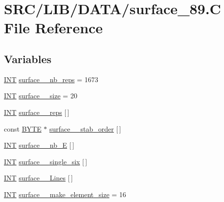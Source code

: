 \hypertarget{surface__89_8_c}{}\section{S\+R\+C/\+L\+I\+B/\+D\+A\+T\+A/surface\+\_\+89.C File Reference}
\label{surface__89_8_c}
\subsection*{Variables}
\begin{DoxyCompactItemize}
\item 
\mbox{\hyperlink{galois_8h_a09fddde158a3a20bd2dcadb609de11dc}{I\+NT}} \mbox{\hyperlink{surface__89_8_c_a9b66df6cbbe464f25589d29b6415114b}{surface\+\_\+\_\+nb\+\_\+reps}} = 1673
\item 
\mbox{\hyperlink{galois_8h_a09fddde158a3a20bd2dcadb609de11dc}{I\+NT}} \mbox{\hyperlink{surface__89_8_c_ab1dce224114a93e0c65da89bc68ef58b}{surface\+\_\+\_\+size}} = 20
\item 
\mbox{\hyperlink{galois_8h_a09fddde158a3a20bd2dcadb609de11dc}{I\+NT}} \mbox{\hyperlink{surface__89_8_c_ab1680931c7ff868b82d0608fe9622550}{surface\+\_\+\_\+reps}} \mbox{[}$\,$\mbox{]}
\item 
const \mbox{\hyperlink{galois_8h_ab6cc7b4aeb6ea31aba2b3fbfc83ff5e6}{B\+Y\+TE}} $\ast$ \mbox{\hyperlink{surface__89_8_c_ac5192d98c7e31d198c05bc14703f6e0a}{surface\+\_\+\_\+stab\+\_\+order}} \mbox{[}$\,$\mbox{]}
\item 
\mbox{\hyperlink{galois_8h_a09fddde158a3a20bd2dcadb609de11dc}{I\+NT}} \mbox{\hyperlink{surface__89_8_c_a3b05ee6cdb04d9cd62e2cd18832a8543}{surface\+\_\+\_\+nb\+\_\+E}} \mbox{[}$\,$\mbox{]}
\item 
\mbox{\hyperlink{galois_8h_a09fddde158a3a20bd2dcadb609de11dc}{I\+NT}} \mbox{\hyperlink{surface__89_8_c_aa70eabce0f9b9bec8c1838d48b423833}{surface\+\_\+\_\+single\+\_\+six}} \mbox{[}$\,$\mbox{]}
\item 
\mbox{\hyperlink{galois_8h_a09fddde158a3a20bd2dcadb609de11dc}{I\+NT}} \mbox{\hyperlink{surface__89_8_c_a529dc2ba013264fe7d463b9ceae8ca5c}{surface\+\_\+\_\+\+Lines}} \mbox{[}$\,$\mbox{]}
\item 
\mbox{\hyperlink{galois_8h_a09fddde158a3a20bd2dcadb609de11dc}{I\+NT}} \mbox{\hyperlink{surface__89_8_c_afa0284de2e889ef4afc1892a095fd2db}{surface\+\_\+\_\+make\+\_\+element\+\_\+size}} = 16
\item 

\end{DoxyCompactItemize}
